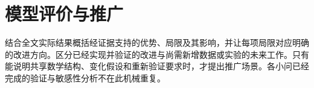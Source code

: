 \section{模型评价与推广}

结合全文实际结果概括经证据支持的优势、局限及其影响，并让每项局限对应明确的改进方向。区分已经实现并验证的改进与尚需新增数据或实验的未来工作。只有能说明共享数学结构、变化假设和重新验证要求时，才提出推广场景。各小问已经完成的验证与敏感性分析不在此机械重复。
